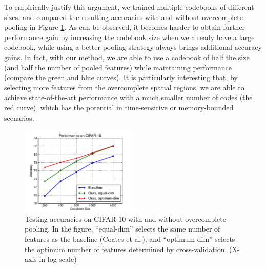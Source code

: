 To empirically justify this argument, we trained multiple codebooks of different sizes, and compared the resulting accuracies with and without overcomplete pooling in Figure \ref{fig:ocpooling}. As can be observed, it becomes harder to obtain further performance gain by increasing the codebook size when we already have a large codebook, while using a better pooling strategy always brings additional accuracy gains. In fact, with our method, we are able to use a codebook of half the size (and half the number of pooled features) while maintaining performance (compare the green and blue curves). It is particularly interesting that, by selecting more features from the overcomplete spatial regions, we are able to achieve state-of-the-art performance with a much smaller number of codes (the red curve), which has the potential in time-sensitive or memory-bounded scenarios.

\begin{figure}
  \centering
  \includegraphics[width=0.5\textwidth]{figs/smartpooling/perf_vs_codes.pdf}
  \caption{Testing accuracies on CIFAR-10 with and without overcomplete pooling. In the figure, ``equal-dim'' selects the same number of features as the baseline (Coates et al.\cite{Coates:wo}), and ``optimum-dim'' selects the optimum number of features determined by cross-validation. (X-axis in log scale)}
  \label{fig:ocpooling}
\end{figure}

